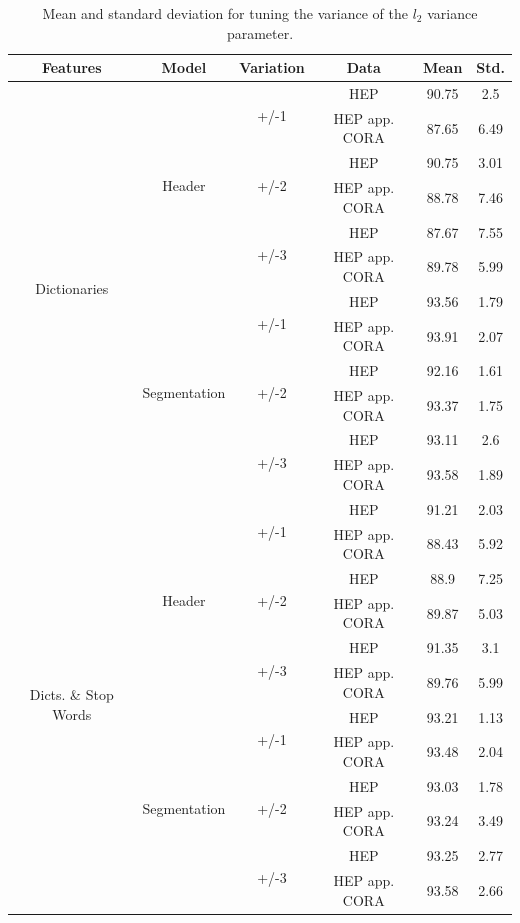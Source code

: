 \begin{table}[h]
\begin{center}
\begin{tabular}{|c|c|c|c|c|c|}
\hline
Features & Model & Variation & Data & Mean & Std.\\
\hline
\multirow{12}{*}{Dictionaries} & \multirow{6}{*}{Header} & \multirow{2}{*}{+/-1} & HEP & 90.75 & 2.5\\\cline{4-6}
& & & HEP app. CORA & 87.65 & 6.49\\\cline{3-6}
& & \multirow{2}{*}{+/-2} & HEP & 90.75 & 3.01\\\cline{4-6}
& & & HEP app. CORA & 88.78 & 7.46\\\cline{3-6}
& & \multirow{2}{*}{+/-3} & HEP & 87.67 & 7.55\\\cline{4-6}
& & & HEP app. CORA & 89.78 & 5.99\\\cline{2-6}
& \multirow{6}{*}{Segmentation} & \multirow{2}{*}{+/-1} & HEP & 93.56 & 1.79\\\cline{4-6}
& & & HEP app. CORA & 93.91 & 2.07\\\cline{3-6}
& & \multirow{2}{*}{+/-2} & HEP & 92.16 & 1.61\\\cline{4-6}
& & & HEP app. CORA & 93.37 & 1.75\\\cline{3-6}
& & \multirow{2}{*}{+/-3} & HEP & 93.11 & 2.6\\\cline{4-6}
& & & HEP app. CORA & 93.58 & 1.89\\
\hline
\multirow{12}{*}{Dicts. \& Stop Words} & \multirow{6}{*}{Header} & \multirow{2}{*}{+/-1} & HEP & 91.21 & 2.03\\\cline{4-6}
& & & HEP app. CORA & 88.43 & 5.92\\\cline{3-6}
& & \multirow{2}{*}{+/-2} & HEP & 88.9 & 7.25\\\cline{4-6}
& & & HEP app. CORA & 89.87 & 5.03\\\cline{3-6}
& & \multirow{2}{*}{+/-3} & HEP & 91.35 & 3.1\\\cline{4-6}
& & & HEP app. CORA & 89.76 & 5.99\\\cline{2-6}
& \multirow{6}{*}{Segmentation} & \multirow{2}{*}{+/-1} & HEP & 93.21 & 1.13\\\cline{4-6}
& & & HEP app. CORA & 93.48 & 2.04\\\cline{3-6}
& & \multirow{2}{*}{+/-2} & HEP & 93.03 & 1.78\\\cline{4-6}
& & & HEP app. CORA & 93.24 & 3.49\\\cline{3-6}
& & \multirow{2}{*}{+/-3} & HEP & 93.25 & 2.77\\\cline{4-6}
& & & HEP app. CORA & 93.58 & 2.66\\
\hline
\end{tabular}
\caption[Mean and standard deviation for tuning the variance of the $l_2$ variance parameter.]{Mean and standard deviation for tuning the variance of the $l_2$ variance parameter.}
\label{table:dictionaryresults}
\end{center}
\end{table}

